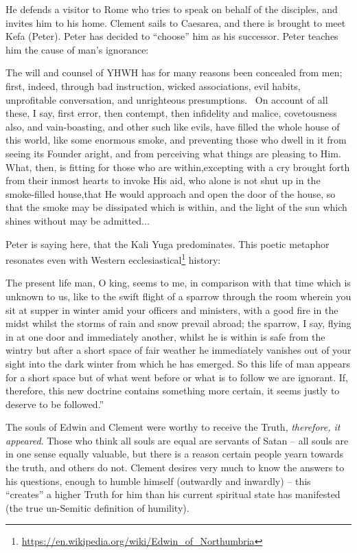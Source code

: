 He defends a visitor to Rome who tries to speak on behalf of the disciples, and invites him to his home. Clement sails to Caesarea, and there is brought to meet Kefa (Peter). Peter has decided to ``choose'' him as his successor. Peter teaches him the cause of man's ignorance:

\begin{quotex}
The will and counsel of YHWH has for many reasons been concealed from men; first, indeed, through bad instruction, wicked associations, evil habits, unprofitable conversation, and unrighteous presumptions.~ On account of all these, I say, first error, then contempt, then infidelity and malice, covetousness also, and vain-boasting, and other such like evils, have filled the whole house of this world, like some enormous smoke, and preventing those who dwell in it from seeing its Founder aright, and from perceiving what things are pleasing to Him. What, then, is fitting for those who are within,excepting with a cry brought forth from their inmost hearts to invoke His aid, who alone is not shut up in the smoke-filled house,that He would approach and open the door of the house, so that the smoke may be dissipated which is within, and the light of the sun which shines without may be admitted... 
\end{quotex}


Peter is saying here, that the Kali Yuga predominates. This poetic metaphor resonates even with Western ecclesiastical\footnote{\url{https://en.wikipedia.org/wiki/Edwin\_of\_Northumbria}} history:

\begin{quotex}
The present life man, O king, seems to me, in comparison with that time which is unknown to us, like to the swift flight of a sparrow through the room wherein you sit at supper in winter amid your officers and ministers, with a good fire in the midst whilst the storms of rain and snow prevail abroad; the sparrow, I say, flying in at one door and immediately another, whilst he is within is safe from the wintry but after a short space of fair weather he immediately vanishes out of your sight into the dark winter from which he has emerged. So this life of man appears for a short space but of what went before or what is to follow we are ignorant. If, therefore, this new doctrine contains something more certain, it seems justly to deserve to be followed.''
\end{quotex}


The souls of Edwin and Clement were worthy to receive the Truth, \emph{therefore, it appeared}. Those who think all souls are equal are servants of Satan -- all souls are in one sense equally valuable, but there is a reason certain people yearn towards the truth, and others do not. Clement desires very much to know the answers to his questions, enough to humble himself (outwardly and inwardly) -- this ``creates'' a higher Truth for him than his current spiritual state has manifested (the true un-Semitic definition of humility).

